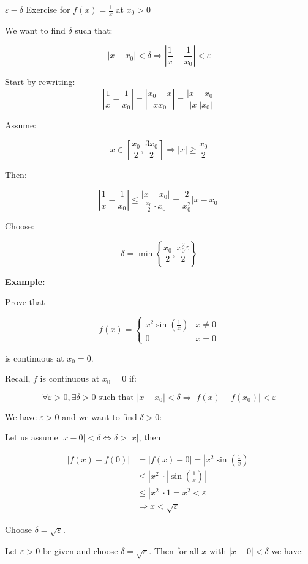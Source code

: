 \(\varepsilon-\delta\) Exercise for \(f(x) = \frac{1}{x}\) at \(x_0 > 0\)

We want to find \(\delta\) such that:

\[
    |x - x_0| < \delta \Rightarrow \left|\frac{1}{x} - \frac{1}{x_0}\right| < \varepsilon
\]

Start by rewriting:
\[
    \left|\frac{1}{x} - \frac{1}{x_0}\right| = \left|\frac{x_0 - x}{xx_0}\right| = \frac{|x - x_0|}{|x||x_0|}
\]

Assume:

\[
    x \in \left[\frac{x_0}{2}, \frac{3x_0}{2}\right] \Rightarrow |x| \ge \frac{x_0}{2}
\]

Then:

\[
    \left|\frac{1}{x} - \frac{1}{x_0}\right| \le \frac{|x - x_0|}{\frac{x_0}{2} \cdot x_0} = \frac{2}{x_0^2} |x - x_0|
\]

Choose:

\[
    \delta = \min\left\{\frac{x_0}{2}, \frac{x_0^2 \varepsilon}{2} \right\}
\]

\textbf{Example:}

Prove that 

\[
    f(x) = \begin{cases} 
    x^2 \sin \left(\frac{1}{x}\right) & x \ne 0 \\ 
    0 & x = 0
    \end{cases}
\]

is continuous at \(x_0 = 0\). 

Recall, \(f\) is continuous at \(x_0 = 0\) if: 

\[
    \forall \varepsilon > 0, \exists \delta > 0 \text{ such that } |x - x_0| < \delta \Rightarrow |f(x) - f(x_0)| < \varepsilon
\]

We have \(\varepsilon > 0\) and we want to find \(\delta > 0\): 

Let us assume \(|x - 0| < \delta \iff \delta > |x|\), then 

\begin{align*}
    |f(x) - f(0)| &= |f(x) - 0| = |x^2 \sin \left(\frac{1}{x}\right)| \\
    &\le |x^2| \cdot \left|\sin \left(\frac{1}{x}\right)\right| \\
    &\le |x^2| \cdot 1 = x^2 < \varepsilon \\ 
    &\Rightarrow x < \sqrt{\varepsilon}
\end{align*}

Choose \(\delta = \sqrt{\varepsilon}\).

Let \(\varepsilon > 0\) be given and choose \(\delta = \sqrt{\varepsilon}\). Then for all \(x\) with \(|x - 0| < \delta\) we have:

